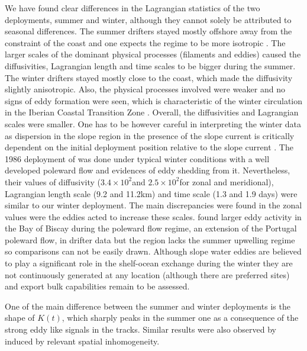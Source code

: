We have found clear differences in the Lagrangian statistics of
the two deployments, summer and winter, although they cannot
solely be attributed to seasonal differences. The summer drifters
stayed mostly offshore away from the constraint of the coast and
one expects the regime to be more isotropic
\citep[e.g.][]{Martins02}. The larger scales of the dominant
physical processes (filaments and eddies) caused the
diffusivities, Lagrangian length and time scales to be bigger
during the summer. The winter drifters stayed mostly close to the
coast, which made the diffusivity slightly anisotropic. Also, the
physical processes involved were weaker and no signs of eddy
formation were seen, which is characteristic of the winter
circulation in the Iberian Coastal Transition Zone
\citep{Haynes91,Huthnance02}. Overall, the diffusivities and
Lagrangian scales were smaller. One has to be however careful in
interpreting the winter data as dispersion in the slope region in
the presence of the slope current is critically dependent on the
initial deployment position relative to the slope current
\citep{Burrows99}. The 1986 deployment of \citet{Haynes91} was
done under typical winter conditions with a well developed
poleward flow and evidences of eddy shedding from it.
Nevertheless, their values of diffusivity ($3.4\times10^2$\mix and
$2.5\times10^2$\mix for zonal and meridional), Lagrangian length
scale (9.2 and 11.2km) and time scale (1.3 and 1.9 days) were
similar to our winter deployment. The main discrepancies were
found in the zonal values were the eddies acted to increase these
scales. \citet{VanAken02} found larger eddy activity in the Bay of
Biscay during the poleward flow regime, an extension of the
Portugal poleward flow, in drifter data but the region lacks the
summer upwelling regime so comparisons can not be easily drawn.
Although slope water eddies are believed to play a significant
role in the shelf-ocean exchange during the winter
\citep{Huthnance02} they are not continuously generated at any
location (although there are preferred sites) and export bulk
capabilities remain to be assessed.

One of the main difference between the summer and winter
deployments is the shape of $K(t)$, which sharply peaks in the
summer one as a consequence of the strong eddy like signals in the
tracks. Similar results were also observed by \citet{Swenson96}
induced by relevant spatial inhomogeneity.

